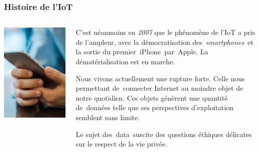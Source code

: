 \documentclass[aspectratio=169,utf8]{beamer}
\begin{document}
\begin{frame}
  \frametitle{Histoire de l'IoT}
  \begin{columns}
    \begin{column}{.3\textwidth}
      \includegraphics[width=\textwidth]{smartphone.jpg}
    \end{column}
    \begin{column}{.7\textwidth}
      C’est néanmoins en \emph{2007} que le phénomène de l'IoT a pris de l’ampleur, avec la démocratisation des \emph{smartphones} et la sortie du premier iPhone par Apple.
      La dématérialisation est en marche.

      Nous vivons actuellement une rupture forte.
      Celle nous permettant de connecter Internet au moindre objet de notre quotidien.
      Ces objets génèrent une quantité de données telle que ses perspectives d’exploitation semblent sans limite.

      Le sujet des data suscite des questions éthiques délicates sur le respect de la vie privée.
    \end{column}
  \end{columns}
\end{frame}
\end{document}
